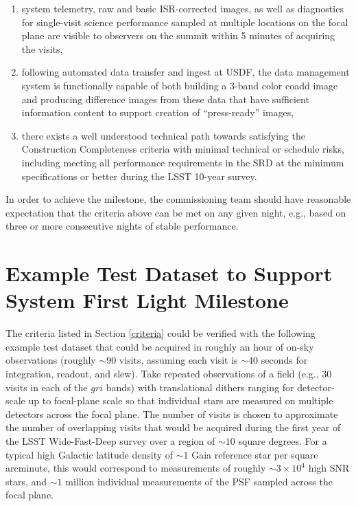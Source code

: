 \documentclass[SE,authoryear,toc,lsstdraft]{lsstdoc}
\begin{document}
\begin{enumerate}
\begin{enumerate}
  \end{enumerate}
  \item system telemetry, raw and basic ISR-corrected images, as well as diagnostics for single-visit science performance sampled at multiple locations on the focal plane are visible to observers on the summit within 5 minutes of acquiring the visits,
  \item following automated data transfer and ingest at USDF, the data management system is functionally capable of both building a 3-band color coadd image and producing difference images from these data that have sufficient information content to support creation of ``press-ready'' images,
  \item there exists a well understood technical path towards satisfying the Construction Completeness criteria  with minimal technical or schedule risks, including meeting all performance requirements in the SRD at the minimum specifications or better during the LSST 10-year survey.
\end{enumerate}

In order to achieve the milestone, the commissioning team should have reasonable expectation that the criteria above can be met on any given night, e.g., based on three or more consecutive nights of stable performance.


\section{Example Test Dataset to Support System First Light Milestone}
\label{dataset}

The criteria listed in Section \ref{criteria} could be verified with the following example test dataset that could be acquired in roughly an hour of on-sky observations (roughly $\sim90$ visits, assuming each visit is $\sim40$ seconds for integration, readout, and slew).
Take repeated observations of a field (e.g., 30 visits in each of the $gri$ bands) with translational dithers ranging for detector-scale up to focal-plane scale so that individual stars are measured on multiple detectors across the focal plane.
The number of visits is chosen to approximate the number of overlapping visits that would be acquired during the first year of the LSST Wide-Fast-Deep survey over a region of $\sim10$ square degrees.
For a typical high Galactic latitude density of $\sim1$ Gaia reference star per square arcminute, this would correspond to measurements of roughly $\sim3 \times 10^4$ high SNR stars, and $\sim1$ million individual measurements of the PSF sampled across the focal plane.
\end{document}
